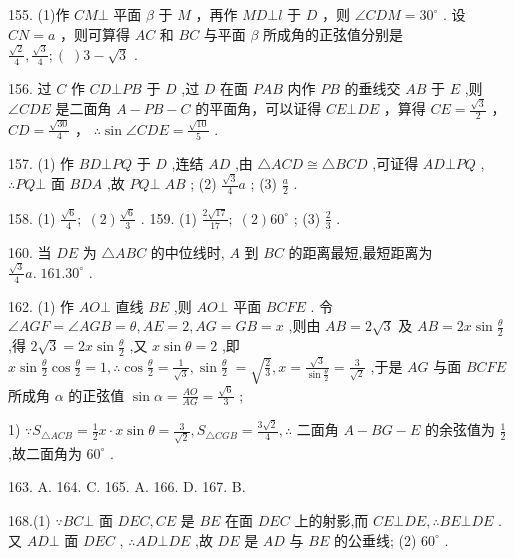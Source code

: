 \documentclass[10pt]{article}
\begin{document}
155. (1)作 \({CM} \bot\) 平面 \(\beta\) 于 \(M\) ，再作 \({MD} \bot  l\) 于 \(D\) ，则 \({\angle CDM} = {30}^{ \circ  }\) . 设 \({CN} = a\) ，则可算得 \({AC}\) 和 \({BC}\) 与平面 \(\beta\) 所成角的正弦值分别是 \(\frac{\sqrt{2}}{4},\frac{\sqrt{3}}{4};\left( \;\right) 3 - \sqrt{3}\) .

156. 过 \(C\) 作 \({CD} \bot  {PB}\) 于 \(D\) ,过 \(D\) 在面 \({PAB}\) 内作 \({PB}\) 的垂线交 \({AB}\) 于 \(E\) ,则 \(\angle {CDE}\) 是二面角 \(A - {PB} - C\) 的平面角，可以证得 \({CE}\bot {DE}\) ，算得 \({CE} = \frac{\sqrt{3}}{2}\) ， \({CD} = \frac{\sqrt{30}}{4}\) ， \(\therefore \sin \angle {CDE} = \frac{\sqrt{10}}{5}\) .

157. (1) 作 \({BD} \bot  {PQ}\) 于 \(D\) ,连结 \({AD}\) ,由 \(\bigtriangleup {ACD} \cong  \bigtriangleup {BCD}\) ,可证得 \({AD} \bot  {PQ}\) , \(\therefore {PQ} \bot\) 面 \({BDA}\) ,故 \({PQ} \bot \; {AB}\) ; (2) \(\frac{\sqrt{3}}{4}a\) ; (3) \(\frac{a}{2}\) .

158. (1) \(\frac{\sqrt{6}}{4};\;\left( 2\right) \frac{\sqrt{6}}{3}\) . 159. (1) \(\frac{2\sqrt{17}}{17};\;\left( 2\right) {60}^{ \circ  }\) ; (3) \(\frac{2}{3}\) .

160. 当 \({DE}\) 为 \(\bigtriangleup {ABC}\) 的中位线时, \(A\) 到 \({BC}\) 的距离最短,最短距离为 \(\frac{\sqrt{3}}{4}a.\;{161}.{30}^{ \circ  }\) .

162. (1) 作 \({AO} \bot\) 直线 \({BE}\) ,则 \({AO} \bot\) 平面 \({BCFE}\) . 令 \(\angle {AGF} = \angle {AGB} = \theta ,{AE} = 2,{AG} = {GB} = x\) ,则由 \({AB} = 2\sqrt{3}\) 及 \({AB} = {2x}\sin \frac{\theta }{2}\) ,得 \(2\sqrt{3} = {2x}\sin \frac{\theta }{2}\) ,又 \(x\sin \theta  = 2\) ,即 \(x\sin \frac{\theta }{2}\cos \frac{\theta }{2} = 1,\therefore \cos \frac{\theta }{2} = \frac{1}{\sqrt{3}},\sin \frac{\theta }{2} \; = \sqrt{\frac{2}{3}},x = \frac{\sqrt{3}}{\sin \frac{\theta }{2}} = \frac{3}{\sqrt{2}}\) ,于是 \({AG}\) 与面 \({BCFE}\) 所成角 \(\alpha\) 的正弦值 \(\sin \alpha  = \frac{AO}{AG} = \frac{\sqrt{6}}{3}\) ;

1) \(\because {S}_{\bigtriangleup {ACB}} = \frac{1}{2}x \cdot  x\sin \theta  = \frac{3}{\sqrt{2}},{S}_{\bigtriangleup {CGB}} = \frac{3\sqrt{2}}{4},\therefore\) 二面角 \(A - {BG} - E\) 的余弦值为 \(\frac{1}{2}\) ,故二面角为 \({60}^{ \circ  }\) .

163. A. 164. C. 165. A. 166. D. 167. B.

168.(1) \(\because {BC} \bot\) 面 \({DEC},{CE}\) 是 \({BE}\) 在面 \({DEC}\) 上的射影,而 \({CE} \bot  {DE},\therefore {BE} \bot  {DE}\) . 又 \({AD} \bot\) 面 \({DEC}\) , \(\therefore {AD} \bot  {DE}\) ,故 \({DE}\) 是 \({AD}\) 与 \({BE}\) 的公垂线; (2) \({60}^{ \circ  }\) .
\end{document}

